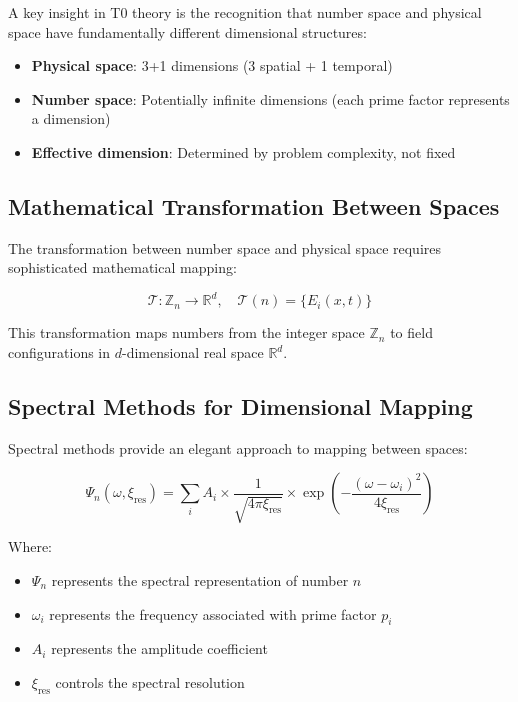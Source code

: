 \documentclass[12pt,a4paper]{article}
\newcommand{\xipar}{\ensuremath{\xi}}
\begin{document}
	A key insight in T0 theory is the recognition that number space and physical space have fundamentally different dimensional structures:
	
	\begin{tcolorbox}[colback=green!5!white,colframe=green!75!black,title=Contrasting Dimensional Structures]
		\begin{itemize}
			\item \textbf{Physical space}: 3+1 dimensions (3 spatial + 1 temporal)
			\item \textbf{Number space}: Potentially infinite dimensions (each prime factor represents a dimension)
			\item \textbf{Effective dimension}: Determined by problem complexity, not fixed
		\end{itemize}
	\end{tcolorbox}
	
	\subsection{Mathematical Transformation Between Spaces}
	\label{subsec:mathematical_transformation}
	
	The transformation between number space and physical space requires sophisticated mathematical mapping:
	
	\begin{equation}
		\mathcal{T}: \mathbb{Z}_n \to \mathbb{R}^d, \quad \mathcal{T}(n) = \{E_i(x,t)\}
	\end{equation}
	
	This transformation maps numbers from the integer space $\mathbb{Z}_n$ to field configurations in $d$-dimensional real space $\mathbb{R}^d$.
	
	\subsection{Spectral Methods for Dimensional Mapping}
	\label{subsec:spectral_methods}
	
	Spectral methods provide an elegant approach to mapping between spaces:
	
	\begin{equation}
		\Psi_n(\omega, \xipar_{\text{res}}) = \sum_i A_i \times \frac{1}{\sqrt{4\pi\xipar_{\text{res}}}} \times \exp\left(-\frac{(\omega-\omega_i)^2}{4\xipar_{\text{res}}}\right)
	\end{equation}
	
	Where:
	\begin{itemize}
		\item $\Psi_n$ represents the spectral representation of number $n$
		\item $\omega_i$ represents the frequency associated with prime factor $p_i$
		\item $A_i$ represents the amplitude coefficient
		\item $\xipar_{\text{res}}$ controls the spectral resolution
	\end{itemize}
	
\end{document}
